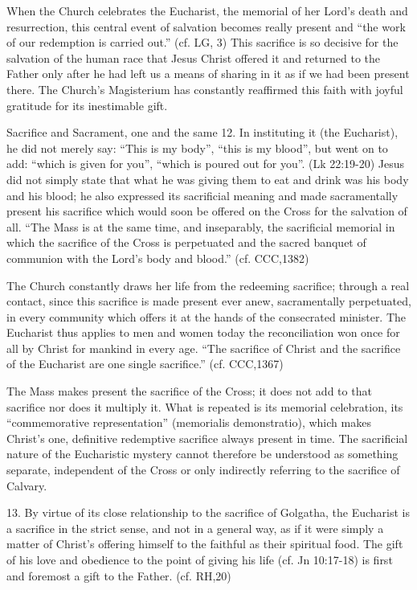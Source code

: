 \documentclass[oneside]{book}
\begin{document}
When the Church celebrates the Eucharist, the memorial of her Lord's death and
resurrection, this central event of salvation becomes really present and ``the
work of our redemption is carried out.'' (cf.  LG, 3) This sacrifice is so
decisive for the salvation of the human race that Jesus Christ offered it and
returned to the Father only after he had left us a means of sharing in it as if
we had been present there. The Church's Magisterium has constantly reaffirmed
this faith with joyful gratitude for its inestimable gift.

Sacrifice and Sacrament, one and the same
12. In instituting it (the Eucharist), he did not merely say: ``This is my
body'', ``this is my blood'', but went on to add: ``which is given for you'',
``which is poured out for you''. (Lk 22:19-20) Jesus did not simply state that
what he was giving them to eat and drink was his body and his blood; he also
expressed its sacrificial meaning and made sacramentally present his sacrifice
which would soon be offered on the Cross for the salvation of all. ``The Mass is
at the same time, and inseparably, the sacrificial memorial in which the
sacrifice of the Cross is perpetuated and the sacred banquet of communion with
the Lord's body and blood.'' (cf. CCC,1382)

The Church constantly draws her life from the redeeming sacrifice;  through a
real contact, since this sacrifice is made present ever anew, sacramentally
perpetuated, in every community which offers it at the hands of the consecrated
minister. The Eucharist thus applies to men and women today the reconciliation
won once for all by Christ for mankind in every age. ``The sacrifice of Christ
and the sacrifice of the Eucharist are one single sacrifice.'' (cf. CCC,1367)

The Mass makes present the sacrifice of the Cross; it does not add to that
sacrifice nor does it multiply it. What is repeated is its memorial celebration,
its ``commemorative representation'' (memorialis demonstratio), which makes
Christ's one, definitive redemptive sacrifice always present in time. The
sacrificial nature of the Eucharistic mystery cannot therefore be understood as
something separate, independent of the Cross or only indirectly referring to the
sacrifice of Calvary.

13. By virtue of its close relationship to the sacrifice of Golgatha, the
Eucharist is a sacrifice in the strict sense, and not in a general way, as if it
were simply a matter of Christ's offering himself to the faithful as their
spiritual food. The gift of his love and obedience to the point of giving his
life (cf. Jn 10:17-18)  is first and foremost a gift to the Father. (cf. RH,20)
\end{document}
